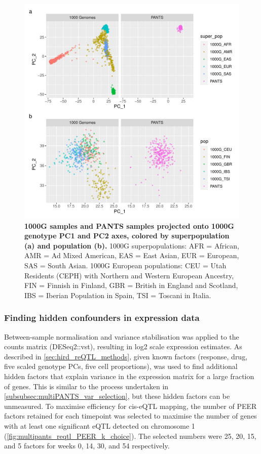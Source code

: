 \begin{figure}
    \centering
    \includegraphics[width=1.0\textwidth,page=1]{mainmatter/figures/chapter_04/pants_samples.sampleids_cleaned_to_lowercase.filtered.GRCh38.sorted.multiPANTS.projection_1000G_pca.pdf}
    \caption{
        \textbf{1000G samples and PANTS samples projected onto 1000G genotype PC1 and PC2 axes, colored by superpopulation (a) and population (b).}
        1000G superpopulations: AFR = African, AMR = Ad Mixed American, EAS = East Asian, EUR = European, SAS = South Asian.
        1000G European populations: CEU = Utah Residents (CEPH) with Northern and Western European Ancestry, FIN = Finnish in Finland, GBR = British in England and Scotland, IBS = Iberian Population in Spain, TSI = Toscani in Italia.
    }
    \label{fig:multipants_genotype_akt_1000g_pca}
\end{figure}

\subsubsection{Finding hidden confounders in expression data}

Between-sample normalisation and variance stabilisation was applied to the counts matrix (DESeq2::vst), resulting in log2 scale expression estimates.
As described in \cref{sec:hird_reQTL_methods},
given known factors (response, drug, five scaled genotype \glspl{PC}, five cell proportions), 
 was used to find additional hidden factors that explain variance in the expression matrix for a large fraction of genes.
This is similar to the process undertaken in \cref{subsubsec:multiPANTS_var_selection}, but these hidden factors can be unmeasured.
To maximise efficiency for cis-\gls{eQTL} mapping, 
the number of PEER factors retained for each timepoint was selected to maximise the number of genes with at least one significant \gls{eQTL} detected on chromosome 1 (\cref{fig:multipants_reqtl_PEER_k_choice}).
The selected numbers were 25, 20, 15, and 5 factors for weeks 0, 14, 30, and 54 respectively.

